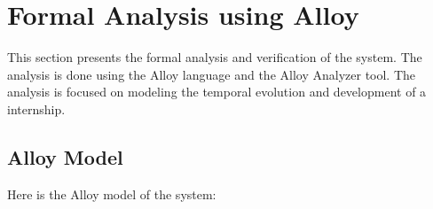 \chapter{Formal Analysis using Alloy}%
\label{chap:Formal-Analysis-using-Alloy}%

\par This section presents the formal analysis and verification of the system. The analysis is done using the Alloy
language and the Alloy Analyzer tool. The analysis is focused on modeling the temporal evolution and development of a
internship.

\section{Alloy Model}%
\label{sec:Alloy-Model}%

\par Here is the Alloy model of the system:

